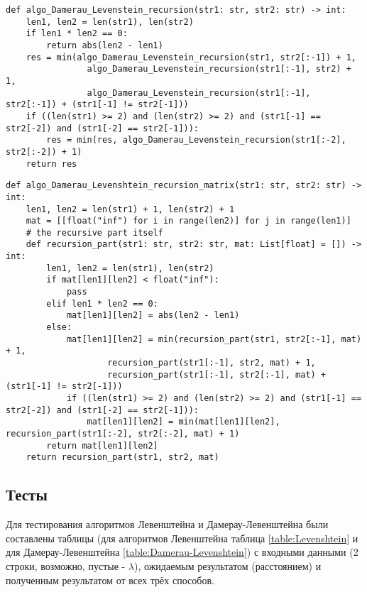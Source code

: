 \vspace{0.25cm}
\begin{lstlisting}[caption=реализация рекурсивного алгоритма Дамерау-Левенштейна, label=lst:damerau_levenshtein_recursive]
def algo_Damerau_Levenstein_recursion(str1: str, str2: str) -> int:
    len1, len2 = len(str1), len(str2)
    if len1 * len2 == 0:
        return abs(len2 - len1)
    res = min(algo_Damerau_Levenstein_recursion(str1, str2[:-1]) + 1,
                algo_Damerau_Levenstein_recursion(str1[:-1], str2) + 1,
                algo_Damerau_Levenstein_recursion(str1[:-1], str2[:-1]) + (str1[-1] != str2[-1]))
    if ((len(str1) >= 2) and (len(str2) >= 2) and (str1[-1] == str2[-2]) and (str1[-2] == str2[-1])):
        res = min(res, algo_Damerau_Levenstein_recursion(str1[:-2], str2[:-2]) + 1)
    return res
\end{lstlisting}

\vspace{0.25cm}
\begin{lstlisting}[caption=реализация рекурсивно-матричного алгоритма Дамерау-Левенштейна, label=lst:damerau_levenstein_recursive_matrix]
def algo_Damerau_Levenshtein_recursion_matrix(str1: str, str2: str) -> int:
    len1, len2 = len(str1) + 1, len(str2) + 1
    mat = [[float("inf") for i in range(len2)] for j in range(len1)]
    # the recursive part itself
    def recursion_part(str1: str, str2: str, mat: List[float] = []) -> int:
        len1, len2 = len(str1), len(str2)
        if mat[len1][len2] < float("inf"):
            pass
        elif len1 * len2 == 0:
            mat[len1][len2] = abs(len2 - len1)
        else:
            mat[len1][len2] = min(recursion_part(str1, str2[:-1], mat) + 1,
                    recursion_part(str1[:-1], str2, mat) + 1,
                    recursion_part(str1[:-1], str2[:-1], mat) + (str1[-1] != str2[-1]))
            if ((len(str1) >= 2) and (len(str2) >= 2) and (str1[-1] == str2[-2]) and (str1[-2] == str2[-1])):
                mat[len1][len2] = min(mat[len1][len2], recursion_part(str1[:-2], str2[:-2], mat) + 1)
        return mat[len1][len2]
    return recursion_part(str1, str2, mat)
\end{lstlisting}


\vspace{0.25cm}
\subsection{Тесты}

\hspace{1.25cm}
Для тестирования алгоритмов Левенштейна и Дамерау-Левенштейна были составлены таблицы (для алгоритмов Левенштейна таблица \ref{table:Levenshtein} и для Дамерау-Левенштейна \ref{table:Damerau-Levenshtein}) с входными данными (2 строки, возможно, пустые - $\lambda$), ожидаемым результатом (расстоянием) и полученным результатом от всех трёх способов.

